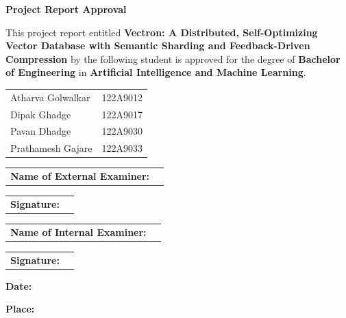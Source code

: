 \newcommand{\customrule}[1]{%
  \begin{tabular}{@{}p{6cm}p{8cm}@{}}
    \textbf{#1:} & \hrulefill
  \end{tabular}%
}

\begin{center}
    \fontsize{25pt}{18pt} {\textbf{Project Report Approval}}
\end{center}

\vspace{0.5 in}

\noindent This project report entitled \textbf{Vectron: A Distributed, Self-Optimizing Vector Database with Semantic Sharding and Feedback-Driven Compression} by the following student is approved for the degree of \textbf{Bachelor of Engineering} in \textbf{Artificial Intelligence and Machine Learning}.

\vspace{10pt}

\begin{center}
  \noindent \begin{tabular}{ll}
    Atharva Golwalkar& \hspace{15pt}122A9012\\ 
    Dipak Ghadge& \hspace{15pt}122A9017\\
    Pavan Dhadge& \hspace{15pt}122A9030\\
    Prathamesh Gajare& \hspace{15pt}122A9033\\
    \end{tabular}
\end{center}

\vspace{1 in}

\customrule{Name of External Examiner} \par
\vspace{20pt} \customrule{Signature}

\vspace{1.5cm}

\customrule{Name of Internal Examiner} \par
\vspace{20pt} \customrule{Signature}

\vspace{2cm}
\noindent\textbf{Date:} \par
\vspace{10pt}
\noindent\textbf{Place:}
